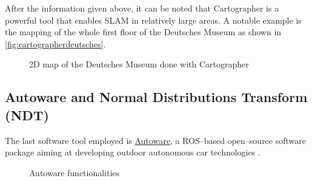 After the information given above, it can be noted that Cartographer is a powerful tool that enables SLAM in relatively large areas. A notable example is the mapping of the whole first floor of the Deutsches Museum as shown in \autoref{fig:cartographerdeutsches}.
\begin{figure}[htb]
  \centering
  \caption[2D map with Cartographer]{2D map of the Deutsches Museum done with Cartographer}
  \label{fig:cartographerdeutsches}
\end{figure}  

\subsection{Autoware and Normal Distributions Transform (NDT)} \label{sub:autoware}

The last software tool employed is \href{https://github.com/CPFL/Autoware}{Autoware}, a ROS--based open--source software package aiming at developing outdoor autonomous car technologies . 

\begin{figure}[htb]
  \centering
  \caption{Autoware functionalities}
  \label{fig:autowaresch}
\end{figure}

